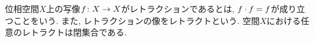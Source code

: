 \documentclass[uplatex, dvipdfmx, a4paper, 12pt, class=jsarticle, crop=false]{standalone}
\begin{document}
\begin{problem}[1.5.C]\label{eng-1-5-C-problem}
	位相空間\(X\)上の写像\(f\colon X\to X\)がレトラクションであるとは,
	\(f \cdot f = f\)が成り立つことをいう.
	また, レトラクションの像をレトラクトという.
	 空間\(X\)における任意のレトラクトは閉集合である.
\end{problem}
\end{document}
